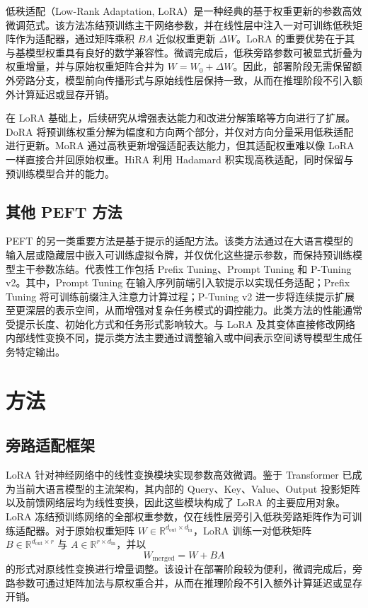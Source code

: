 \documentclass[UTF8,a4paper,11pt]{ctexart}
\newcommand{\R}{\mathbb{R}}
\newcommand{\DeltaW}{\Delta W}
\begin{document}
低秩适配（Low-Rank Adaptation, LoRA）是一种经典的基于权重更新的参数高效微调范式\cite{hu2022lora}。该方法冻结预训练主干网络参数，并在线性层中注入一对可训练低秩矩阵作为适配器，通过矩阵乘积 $BA$ 近似权重更新 $\DeltaW$。LoRA 的重要优势在于其与基模型权重具有良好的数学兼容性。微调完成后，低秩旁路参数可被显式折叠为权重增量，并与原始权重矩阵合并为 $W=W_0+\DeltaW$。因此，部署阶段无需保留额外旁路分支，模型前向传播形式与原始线性层保持一致，从而在推理阶段不引入额外计算延迟或显存开销。

在 LoRA 基础上，后续研究从增强表达能力和改进分解策略等方向进行了扩展。DoRA\cite{liu2024dora} 将预训练权重分解为幅度和方向两个部分，并仅对方向分量采用低秩适配进行更新。MoRA\cite{jiang2024mora} 通过高秩更新增强适配表达能力，但其适配权重难以像 LoRA 一样直接合并回原始权重。HiRA\cite{huang2025hira} 利用 Hadamard 积实现高秩适配，同时保留与预训练模型合并的能力。

\subsection{其他 PEFT 方法}

PEFT 的另一类重要方法是基于提示的适配方法。该类方法通过在大语言模型的输入层或隐藏层中嵌入可训练虚拟令牌，并仅优化这些提示参数，而保持预训练模型主干参数冻结。代表性工作包括 Prefix Tuning\cite{li2021prefix}、Prompt Tuning\cite{lester2021power} 和 P-Tuning v2\cite{xiao2022ptuning}。其中，Prompt Tuning 在输入序列前端引入软提示以实现任务适配；Prefix Tuning 将可训练前缀注入注意力计算过程；P-Tuning v2 进一步将连续提示扩展至更深层的表示空间，从而增强对复杂任务模式的调控能力。此类方法的性能通常受提示长度、初始化方式和任务形式影响较大。与 LoRA 及其变体直接修改网络内部线性变换不同，提示类方法主要通过调整输入或中间表示空间诱导模型生成任务特定输出。

\section{方法}

\subsection{旁路适配框架}

LoRA 针对神经网络中的线性变换模块实现参数高效微调。鉴于 Transformer\cite{vaswani2017attention} 已成为当前大语言模型的主流架构，其内部的 Query、Key、Value、Output 投影矩阵以及前馈网络层均为线性变换，因此这些模块构成了 LoRA 的主要应用对象。LoRA 冻结预训练网络的全部权重参数，仅在线性层旁引入低秩旁路矩阵作为可训练适配器。对于原始权重矩阵 $W\in\R^{d_{\mathrm{out}}\times d_{\mathrm{in}}}$，LoRA 训练一对低秩矩阵 $B\in\R^{d_{\mathrm{out}}\times r}$ 与 $A\in\R^{r\times d_{\mathrm{in}}}$，并以
\begin{equation}
    W_{\mathrm{merged}} = W + BA
\end{equation}
的形式对原线性变换进行增量调整。该设计在部署阶段较为便利，微调完成后，旁路参数可通过矩阵加法与原权重合并，从而在推理阶段不引入额外计算延迟或显存开销。
\end{document}
